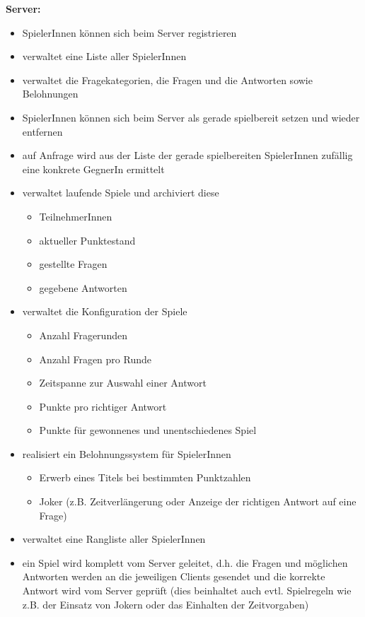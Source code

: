 \documentclass[fontsize=12pt,paper=a4,twoside]{scrartcl}
\begin{document}
\textbf{Server:}
\begin{itemize}
\item SpielerInnen können sich beim Server registrieren
\item verwaltet eine Liste aller SpielerInnen
\item verwaltet die Fragekategorien, die Fragen und die Antworten sowie Belohnungen
\item SpielerInnen können sich beim Server als gerade spielbereit setzen und wieder entfernen
\item auf Anfrage wird aus der Liste der gerade spielbereiten SpielerInnen zufällig eine konkrete GegnerIn ermittelt
\item verwaltet laufende Spiele und archiviert diese
\begin{itemize}
\item TeilnehmerInnen
\item aktueller Punktestand
\item gestellte Fragen
\item gegebene Antworten
\end{itemize}
\end{itemize}
\begin{itemize}
\item verwaltet die Konfiguration der Spiele
\begin{itemize}
\item Anzahl Fragerunden
\item Anzahl Fragen pro Runde
\item Zeitspanne zur Auswahl einer Antwort
\item Punkte pro richtiger Antwort
\item Punkte für gewonnenes und unentschiedenes Spiel
\end{itemize}
\end{itemize}
\begin{itemize}
\item realisiert ein Belohnungssystem für SpielerInnen
\begin{itemize}
\item Erwerb eines Titels bei bestimmten Punktzahlen
\item Joker (z.B. Zeitverlängerung oder Anzeige der richtigen Antwort auf eine Frage)
\end{itemize}
\end{itemize}
\begin{itemize}
\item verwaltet eine Rangliste aller SpielerInnen
\item ein Spiel wird komplett vom Server geleitet, d.h. die Fragen und möglichen Antworten werden an die jeweiligen Clients gesendet und die korrekte Antwort wird vom Server geprüft (dies beinhaltet auch evtl. Spielregeln wie z.B. der Einsatz von Jokern oder das Einhalten der Zeitvorgaben)
\end{itemize}
\end{document}
